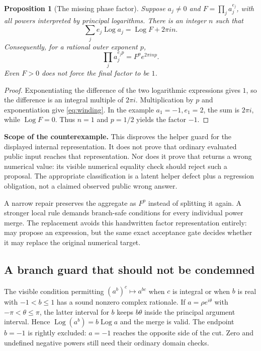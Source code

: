 \documentclass[11pt,letterpaper]{article}
\numberwithin{equation}{section}
\newtheorem{proposition}[theorem]{Proposition}
\theoremstyle{definition}\newtheorem{definition}[theorem]{Definition}
\theoremstyle{remark}\newtheorem{remark}[theorem]{Remark}
\newcommand{\code}[1]{\texttt{\detokenize{#1}}}
\begin{document}
\begin{proposition}[The missing phase factor]\label{prop:winding}
Suppose $a_j\ne0$ and $F=\prod_j a_j^{e_j}$, with all powers interpreted by principal logarithms. There is an integer $n$ such that
\[
 \sum_j e_j\operatorname{Log}a_j=\operatorname{Log}F+2\pi i n.
\]
Consequently, for a rational outer exponent $p$,
\begin{equation}\label{eq:winding}
 \prod_j a_j^{e_jp}=F^p e^{2\pi i n p}.
\end{equation}
Even $F>0$ does not force the final factor to be $1$.
\end{proposition}
\begin{proof}
Exponentiating the difference of the two logarithmic expressions gives $1$, so the difference is an integral multiple of $2\pi i$. Multiplication by $p$ and exponentiation give \eqref{eq:winding}. In the example $a_1=-1,e_1=2$, the sum is $2\pi i$, while $\operatorname{Log}F=0$. Thus $n=1$ and $p=1/2$ yields the factor $-1$.
\end{proof}

\textbf{Scope of the counterexample.} This disproves the helper guard for the displayed internal representation. It does not prove that ordinary evaluated public input reaches that representation. Nor does it prove that \code{Factorc} returns a wrong numerical value: its visible numerical equality check should reject such a proposal. The appropriate classification is a latent helper defect plus a regression obligation, not a claimed observed public wrong answer.

A narrow repair preserves the aggregate as $F^p$ instead of splitting it again. A stronger local rule demands branch-safe conditions for every individual power merge. The replacement avoids this handwritten factor representation entirely: \code{Factor} may propose an expression, but the same exact acceptance gate decides whether it may replace the original numerical target.

\subsection{A branch guard that should not be condemned}
The visible condition permitting $(a^b)^c\mapsto a^{bc}$ when $c$ is integral or when $b$ is real with $-1<b\le1$ has a sound nonzero complex rationale. If $a=\rho e^{i\theta}$ with $-\pi<\theta\le\pi$, the latter interval for $b$ keeps $b\theta$ inside the principal argument interval. Hence $\operatorname{Log}(a^b)=b\operatorname{Log}a$ and the merge is valid. The endpoint $b=-1$ is rightly excluded: $a=-1$ reaches the opposite side of the cut. Zero and undefined negative powers still need their ordinary domain checks.
\end{document}

